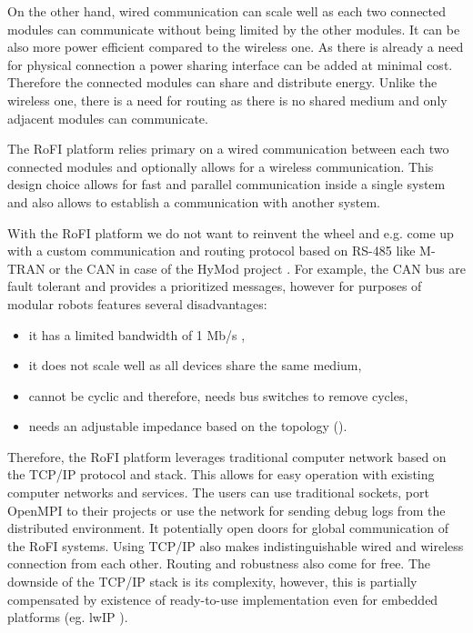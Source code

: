 On the other hand, wired communication can scale well as each two connected
modules can communicate without being limited by the other modules. It can be
also more power efficient compared to the wireless one. As there is already a
need for physical connection a power sharing interface can be added at minimal
cost. Therefore the connected modules can share and distribute energy. Unlike
the wireless one, there is a need for routing as there is no shared medium and
only adjacent modules can communicate.

The RoFI platform relies primary on a wired communication between each two
connected modules and optionally allows for a wireless communication. This
design choice allows for fast and parallel communication inside a single system
and also allows to establish a communication with another system.

With the RoFI platform we do not want to reinvent the wheel and e.g. come up
with a custom communication and routing protocol based on RS-485 like M-TRAN or
the CAN in case of the HyMod project \cite{parrott_hymod:_2016}. For example,
the CAN bus are fault tolerant and provides a prioritized messages, however for
purposes of modular robots features several disadvantages:
\begin{itemize}
    \item it has a limited bandwidth of 1 Mb/s \cite{noauthor_road_2013},
    \item it does not scale well as all devices share the same medium,
    \item cannot be cyclic and therefore, needs bus switches to remove cycles,
    \item needs an adjustable impedance based on the topology
    (\cite{parrott_hymod:_2016}).
\end{itemize}

Therefore, the RoFI platform leverages traditional computer network based on the
TCP/IP protocol and stack. This allows for easy operation with existing computer
networks and services. The users can use traditional sockets, port OpenMPI to
their projects or use the network for sending debug logs from the distributed
environment. It potentially open doors for global communication of the RoFI
systems. Using TCP/IP also makes indistinguishable wired and wireless connection
from each other. Routing and robustness also come for free. The downside of the
TCP/IP stack is its complexity, however, this is partially compensated by
existence of ready-to-use implementation even for embedded platforms (eg. lwIP
\cite{noauthor_lwip_nodate}).

